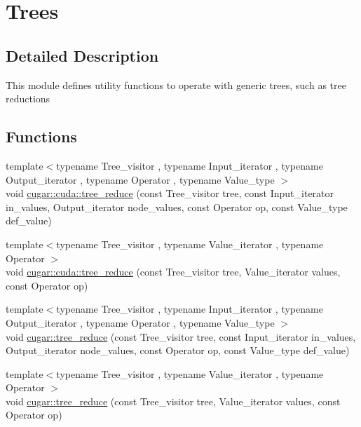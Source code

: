 \hypertarget{group___trees_module}{}\section{Trees}
\label{group___trees_module}


\subsection{Detailed Description}
This module defines utility functions to operate with generic trees, such as tree reductions \subsection*{Functions}
\begin{DoxyCompactItemize}
\item 
{\footnotesize template$<$typename Tree\+\_\+visitor , typename Input\+\_\+iterator , typename Output\+\_\+iterator , typename Operator , typename Value\+\_\+type $>$ }\\void \hyperlink{group___trees_module_ga8044d04a72e3a0a2bf628bbfc237f954}{cugar\+::cuda\+::tree\+\_\+reduce} (const Tree\+\_\+visitor tree, const Input\+\_\+iterator in\+\_\+values, Output\+\_\+iterator node\+\_\+values, const Operator op, const Value\+\_\+type def\+\_\+value)
\item 
{\footnotesize template$<$typename Tree\+\_\+visitor , typename Value\+\_\+iterator , typename Operator $>$ }\\void \hyperlink{group___trees_module_gaf560f435723578e34050172fab671529}{cugar\+::cuda\+::tree\+\_\+reduce} (const Tree\+\_\+visitor tree, Value\+\_\+iterator values, const Operator op)
\item 
{\footnotesize template$<$typename Tree\+\_\+visitor , typename Input\+\_\+iterator , typename Output\+\_\+iterator , typename Operator , typename Value\+\_\+type $>$ }\\void \hyperlink{group___trees_module_gaf7e2c5b8c843cd382db2d1b23c981694}{cugar\+::tree\+\_\+reduce} (const Tree\+\_\+visitor tree, const Input\+\_\+iterator in\+\_\+values, Output\+\_\+iterator node\+\_\+values, const Operator op, const Value\+\_\+type def\+\_\+value)
\item 
{\footnotesize template$<$typename Tree\+\_\+visitor , typename Value\+\_\+iterator , typename Operator $>$ }\\void \hyperlink{group___trees_module_ga808e7cb4b98d8dc0c3ef125ca457cb68}{cugar\+::tree\+\_\+reduce} (const Tree\+\_\+visitor tree, Value\+\_\+iterator values, const Operator op)
\end{DoxyCompactItemize}


